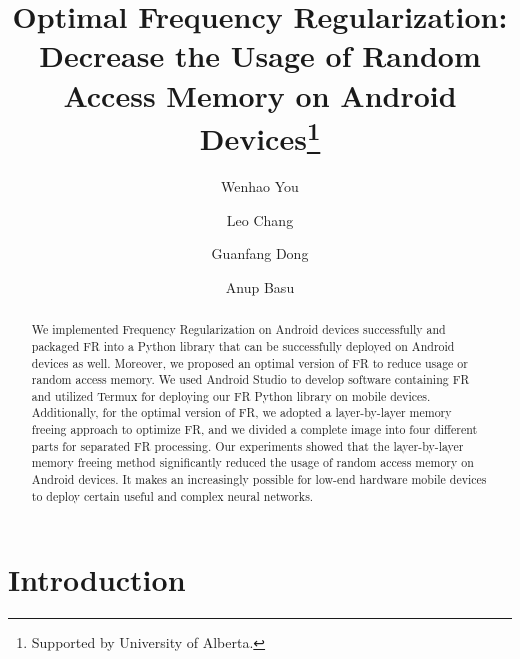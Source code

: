 \documentclass[runningheads]{llncs}
\begin{document}
%
\title{Optimal Frequency Regularization: Decrease the Usage of Random Access Memory on Android Devices\thanks{Supported by University of Alberta.}}
%
%
\author{Wenhao You \and
Leo Chang \and
Guanfang Dong \and
Anup Basu}
%
%
%
\maketitle              %
%
\begin{abstract}
We implemented Frequency Regularization on Android devices successfully and packaged FR into a Python library that can be successfully deployed on Android devices as well. Moreover, we proposed an optimal version of FR to reduce usage or random access memory. We used Android Studio to develop software containing FR and utilized Termux for deploying our FR Python library on mobile devices. Additionally, for the optimal version of FR, we adopted a layer-by-layer memory freeing approach to optimize FR, and we divided a complete image into four different parts for separated FR processing. Our experiments showed that the layer-by-layer memory freeing method significantly reduced the usage of random access memory on Android devices. It makes an increasingly possible for low-end hardware mobile devices to deploy certain useful and complex neural networks.

\end{abstract}
%
%
%
\section{Introduction}
\end{document}
